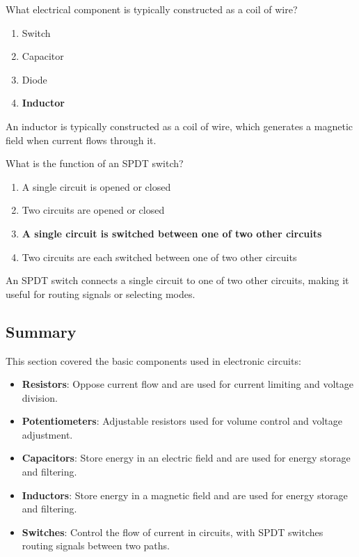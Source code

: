 
\begin{tcolorbox}[colback=gray!10!white,colframe=black!75!black,title={T6A07}]
    What electrical component is typically constructed as a coil of wire?
    \begin{enumerate}[label=\Alph*,noitemsep]
        \item Switch
        \item Capacitor
        \item Diode
        \item \textbf{Inductor}
    \end{enumerate}
\end{tcolorbox}
An inductor is typically constructed as a coil of wire, which generates a magnetic field when current flows through it.


\begin{tcolorbox}[colback=gray!10!white,colframe=black!75!black,title={T6A08}]
    What is the function of an SPDT switch?
    \begin{enumerate}[label=\Alph*,noitemsep]
        \item A single circuit is opened or closed
        \item Two circuits are opened or closed
        \item \textbf{A single circuit is switched between one of two other circuits}
        \item Two circuits are each switched between one of two other circuits
    \end{enumerate}
\end{tcolorbox}
An SPDT switch connects a single circuit to one of two other circuits, making it useful for routing signals or selecting modes.


\subsection*{Summary}
This section covered the basic components used in electronic circuits:
\begin{itemize}
    \item \textbf{Resistors}: Oppose current flow and are used for current limiting and voltage division.
    \item \textbf{Potentiometers}: Adjustable resistors used for volume control and voltage adjustment.
    \item \textbf{Capacitors}: Store energy in an electric field and are used for energy storage and filtering.
    \item \textbf{Inductors}: Store energy in a magnetic field and are used for energy storage and filtering.
    \item \textbf{Switches}: Control the flow of current in circuits, with SPDT switches routing signals between two paths.
\end{itemize}
